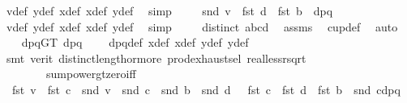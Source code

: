 \begin{isabellebody}
\ v{\isacharunderscore}{\kern0pt}def\ y{}{\isacharunderscore}{\kern0pt}def\ x{}{\isacharunderscore}{\kern0pt}def\ x{}{\isacharunderscore}{\kern0pt}def\ y{}{\isacharunderscore}{\kern0pt}def\ \isamarkupfalse%
\ simp\isanewline
\ \ \isamarkupfalse%
\ {}{\isacharcolon}{\kern0pt}\ {\isachardoublequoteopen}snd\ v\ {\isacharequal}{\kern0pt}\ {\isacharparenleft}{\kern0pt}fst\ d\ {\isacharminus}{\kern0pt}\ fst\ b{\isacharparenright}{\kern0pt}\ {\isacharslash}{\kern0pt}\ dpq{\isachardoublequoteclose}\ \isamarkupfalse%
\ v{\isacharunderscore}{\kern0pt}def\ y{}{\isacharunderscore}{\kern0pt}def\ x{}{\isacharunderscore}{\kern0pt}def\ x{}{\isacharunderscore}{\kern0pt}def\ y{}{\isacharunderscore}{\kern0pt}def\ \isamarkupfalse%
\ simp\ \isanewline
\ \ \isamarkupfalse%
\ {\isachardoublequoteopen}distinct\ {\isacharbrackleft}{\kern0pt}a{\isacharcomma}{\kern0pt}b{\isacharcomma}{\kern0pt}c{\isacharcomma}{\kern0pt}d{\isacharbrackright}{\kern0pt}{\isachardoublequoteclose}\ \isamarkupfalse%
\ assms\ \isamarkupfalse%
\ cup{\isacharunderscore}{\kern0pt}def\ \isamarkupfalse%
\ auto\isanewline
\ \ \isamarkupfalse%
\ dpqGT{}{\isacharcolon}{\kern0pt}\ {\isachardoublequoteopen}dpq\ {\isachargreater}{\kern0pt}\ {}{\isachardoublequoteclose}\ \isamarkupfalse%
\ dpq{\isacharunderscore}{\kern0pt}def\ x{}{\isacharunderscore}{\kern0pt}def\ x{}{\isacharunderscore}{\kern0pt}def\ y{}{\isacharunderscore}{\kern0pt}def\ y{}{\isacharunderscore}{\kern0pt}def\ \isanewline
\ \ \ \ \isamarkupfalse%
\ {\isacharparenleft}{\kern0pt}smt\ {\isacharparenleft}{\kern0pt}verit{\isacharparenright}{\kern0pt}\ distinct{\isacharunderscore}{\kern0pt}length{\isacharunderscore}{\kern0pt}{}{\isacharunderscore}{\kern0pt}or{\isacharunderscore}{\kern0pt}more\ prod{\isachardot}{\kern0pt}exhaust{\isacharunderscore}{\kern0pt}sel\ real{\isacharunderscore}{\kern0pt}less{\isacharunderscore}{\kern0pt}rsqrt\isanewline
\ \ \ \ \ \ \ \ sum{\isacharunderscore}{\kern0pt}power{}{\isacharunderscore}{\kern0pt}gt{\isacharunderscore}{\kern0pt}zero{\isacharunderscore}{\kern0pt}iff{\isacharparenright}{\kern0pt}\isanewline
\ \ \isamarkupfalse%
\ {}{\isacharcolon}{\kern0pt}\ {\isachardoublequoteopen}fst\ v\ {\isasymbullet}\ fst\ c\ {\isacharplus}{\kern0pt}\ snd\ v\ {\isasymbullet}\ snd\ c\ {\isacharequal}{\kern0pt}\ {\isacharparenleft}{\kern0pt}{\isacharparenleft}{\kern0pt}snd\ b\ {\isacharminus}{\kern0pt}\ snd\ d{\isacharparenright}{\kern0pt}\ {\isacharasterisk}{\kern0pt}\ \ fst\ c\ {\isacharplus}{\kern0pt}\ {\isacharparenleft}{\kern0pt}fst\ d\ {\isacharminus}{\kern0pt}\ fst\ b{\isacharparenright}{\kern0pt}\ {\isacharasterisk}{\kern0pt}\ snd\ c{\isacharparenright}{\kern0pt}{\isacharslash}{\kern0pt}dpq{\isachardoublequoteclose}\isanewline

\end{isabellebody}

